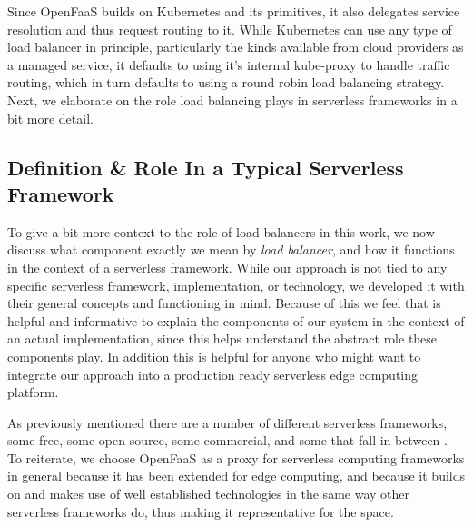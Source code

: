 Since OpenFaaS\cite{openfaas} builds on Kubernetes and its primitives, it also delegates service resolution and thus request routing to it.
While Kubernetes can use any type of load balancer in principle, particularly the kinds available from cloud providers as a managed service, it defaults to using it's internal kube-proxy to handle traffic routing, which in turn defaults to using a round robin load balancing strategy.
Next, we elaborate on the role load balancing plays in serverless frameworks in a bit more detail.


\subsection{ Definition \& Role In a Typical Serverless Framework}
To give a bit more context to the role of load balancers in this work, we now discuss what component exactly we mean by \textit{load balancer}, and how it functions in the context of a serverless framework. While our approach is not tied to any specific serverless framework, implementation, or technology, we developed it with their general concepts and functioning in mind. Because of this we feel that is helpful and informative to explain the components of our system in the context of an actual implementation, since this helps understand the abstract role these components play. In addition this is helpful for anyone who might want to integrate our approach into a production ready serverless edge computing platform.

As previously mentioned there are a number of different serverless frameworks, some free, some open source, some commercial, and some that fall in-between\cite{aws-lambda}\cite{azure-functions} \cite{openfaas-gateway}\cite{kubeless}\cite{openwhisk}.
To reiterate, we choose OpenFaaS as a proxy for serverless computing frameworks in general because it has been extended for edge computing, and because it builds on and makes use of well established technologies in the same way other serverless frameworks do\cite{kubeless}\cite{openwhisk}, thus making it representative for the space.


